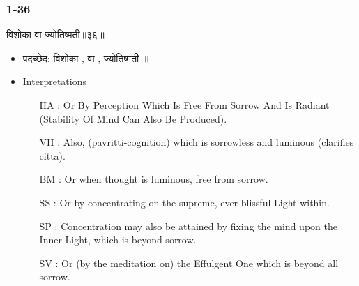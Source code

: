 \begin{frame}[fragile]\frametitle{1-36}
\begin{sanskrit}
विशोका वा ज्योतिष्मती॥३६॥
\end{sanskrit}

	\begin{itemize}
	\item पदच्छेद: विशोका , वा , ज्योतिष्मती ॥
	\item Interpretations
		\begin{itemize}	
		\item [HA]: Or By Perception Which Is Free From Sorrow And Is Radiant (Stability Of Mind Can Also Be Produced).
		\item [VH]: Also, (pavritti-cognition) which is sorrowless and luminous (clarifies citta).
		\item [BM]: Or when thought is luminous, free from sorrow.
		\item [SS]: Or by concentrating on the supreme, ever-blissful Light within.
		\item [SP]: Concentration may also be attained by fixing the mind upon the Inner Light, which is beyond sorrow.
		\item [SV]: Or (by the meditation on) the Effulgent One which is beyond all sorrow. 
		\end{itemize}
	\end{itemize}
	
\end{frame}





